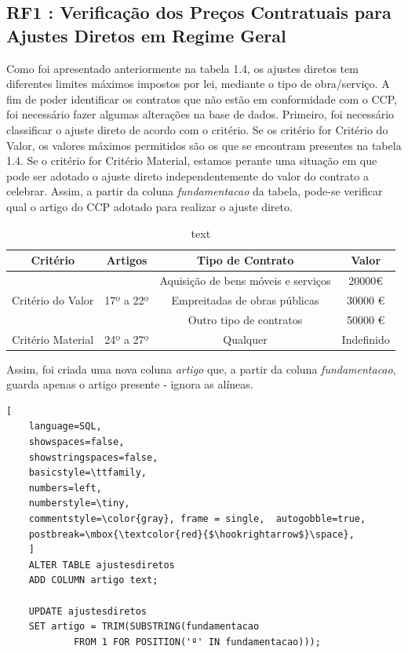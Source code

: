 \subsection{RF1 : Verificação dos Preços Contratuais para Ajustes Diretos em Regime Geral}


Como foi apresentado anteriormente na tabela 1.4, os ajustes diretos tem diferentes limites máximos impostos por lei, mediante o tipo de obra/serviço. 
A fim de poder identificar os contratos que não estão em conformidade com o CCP, foi necessário fazer algumas alterações na base de dados. Primeiro, foi necessário classificar o ajuste direto de acordo com o critério. Se os critério for Critério do Valor, os valores máximos permitidos são os que se encontram presentes na tabela 1.4. Se o critério for Critério Material, estamos perante uma situação em que pode ser adotado o ajuste direto independentemente do valor do contrato a celebrar. Assim, a partir da coluna \textit{fundamentacao} da tabela, pode-se verificar qual o artigo do CCP adotado para realizar o ajuste direto. 


\begin{table}[H]
	\centering
	\begin{tabular}{|c|c|c|c|}
		\hline
		\textbf{Critério}                  & \textbf{Artigos}           & \textbf{Tipo de Contrato}           & \textbf{Valor} \\ \hline
		\multirow{3}{*}{Critério do Valor} & \multirow{3}{*}{17º a 22º} & Aquisição de bens móveis e serviços & 20000€         \\ \cline{3-4} 
		&                            & Empreitadas de obras públicas       & 30000 €        \\ \cline{3-4} 
		&                            & Outro tipo de contratos             & 50000 €        \\ \hline
		Critério Material                  & 24º a 27º                  & Qualquer                            & Indefinido     \\ \hline
	\end{tabular}
	\caption{text}
\end{table}

Assim, foi criada uma nova coluna \textit{artigo} que, a partir da coluna \textit{fundamentacao}, guarda apenas o artigo presente - ignora as alíneas. 

\begin{lstlisting}[
	language=SQL,
	showspaces=false,
	showstringspaces=false,
	basicstyle=\ttfamily,
	numbers=left,
	numberstyle=\tiny,
	commentstyle=\color{gray}, frame = single,	autogobble=true,
	postbreak=\mbox{\textcolor{red}{$\hookrightarrow$}\space},
	]
	ALTER TABLE ajustesdiretos
	ADD COLUMN artigo text;
	
	UPDATE ajustesdiretos
	SET artigo = TRIM(SUBSTRING(fundamentacao 
			FROM 1 FOR POSITION('º' IN fundamentacao)));
\end{lstlisting}





